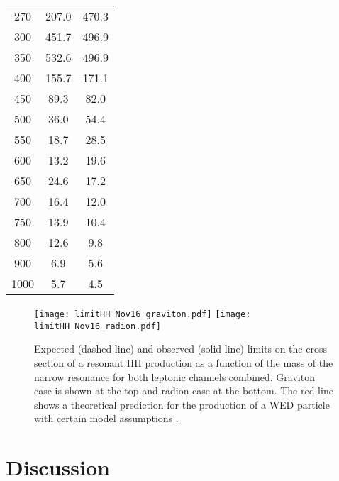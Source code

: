 \begin{small}
\begin{table}[H]
\begin{center}
\begin{tabular}{|c|c|c|}
     270 &               207.0 &               470.3 \\
     300 &               451.7 &               496.9 \\
     350 &               532.6 &               496.9 \\
     400 &               155.7 &               171.1 \\
     450 &                89.3 &                82.0 \\
     500 &                36.0 &                54.4 \\
     550 &                18.7 &                28.5 \\
     600 &                13.2 &                19.6 \\
     650 &                24.6 &                17.2 \\
     700 &                16.4 &                12.0 \\
     750 &                13.9 &                10.4 \\
     800 &                12.6 &                 9.8 \\
     900 &                 6.9 &                 5.6 \\
    1000 &                 5.7 &                 4.5 \\
\hline
\end{tabular}
\end{center}
\end{table}

\begin{figure}[H]                                                                                       
  \begin{center}
    \texttt{[image: limitHH\_Nov16\_graviton.pdf]}
    \texttt{[image: limitHH\_Nov16\_radion.pdf]}
    \caption{ Expected (dashed line) and observed (solid line) limits on the cross section of a resonant HH production
      as a function of the mass of the narrow resonance for both leptonic channels combined. Graviton case is shown at the top and radion case at the bottom. The red line shows a theoretical prediction for
      the production of a WED particle with certain model assumptions \cite{Oliveira:2014kla}.}
    \label{fig:HHlimits}                                                                             
  \end{center}
\end{figure}

\section{Discussion}
\label{sec:Discussion}


\end{small}
